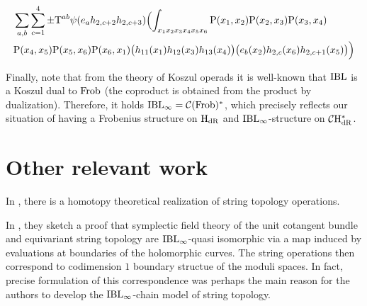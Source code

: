 \documentclass[\MainFolder/Text.tex]{subfiles}
\begin{document}
\begin{center}
$$\begin{aligned}
&\sum_{a,b}\sum_{c=1}^4 \pm  \mathrm{T}^{ab} \psi(e_a  h_{2,c+2}  h_{2,c+3})  \Bigl(\int_{x_1 x_2 x_3 x_4 x_5 x_6} \mathrm{P}(x_1,x_2)\mathrm{P}(x_2,x_3)\mathrm{P}(x_3,x_4)\\
&\mathrm{P}(x_4,x_5)\mathrm{P}(x_5,x_6)\mathrm{P}(x_6,x_1)\bigl( h_{11}(x_1) h_{12}(x_3)
h_{13}(x_4)\bigr)\bigl(e_b(x_2)  h_{2,c}(x_6)  h_{2,c+1}(x_5)\bigr)\Bigr)
\end{aligned}
$$
\end{center}


Finally, note that from the theory of Koszul operads it is well-known that $\mathrm{IBL}$ is a Koszul dual to $\mathrm{Frob}$ (the coproduct is obtained from the product by dualization). Therefore, it holds $\mathrm{IBL}_\infty = \mathcal{C}(\mathrm{Frob})^*$, which precisely reflects our situation of having a Frobenius structure on $\mathrm{H}_{\mathrm{dR}}$ and $\mathrm{IBL}_\infty$-structure on $\mathcal{C}\mathrm{H}_{\mathrm{dR}}^*$.

\section{Other relevant work}

In \cite{Cohen2001}, there is a homotopy theoretical realization of string topology operations.

In \cite{Cieliebak2007}, they sketch a proof that symplectic field theory of the unit cotangent bundle and equivariant string topology are $\mathrm{IBL}_\infty$-quasi isomorphic via a map induced by evaluations at boundaries of the holomorphic curves. The string operations then correspond to codimension $1$ boundary structue of the moduli spaces. In fact, precise formulation of this correspondence was perhaps the main reason for the authors to develop the $\mathrm{IBL}_\infty$-chain model of string topology.
\end{document}
